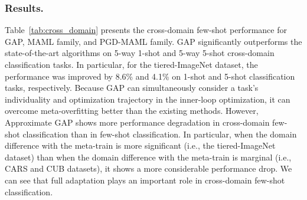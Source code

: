 \subsubsection{Results.}
Table~\ref{tab:cross_domain} presents the cross-domain few-shot performance for GAP, MAML family, and PGD-MAML family. GAP significantly outperforms the state-of-the-art algorithms on 5-way 1-shot and 5-way 5-shot cross-domain classification tasks. In particular, for the tiered-ImageNet dataset, the performance was improved by 8.6\% and 4.1\% on 1-shot and 5-shot classification tasks, respectively. Because GAP can simultaneously consider a task's individuality and optimization trajectory in the inner-loop optimization, it can overcome meta-overfitting better than the existing methods. 
However, Approximate GAP shows more performance degradation in cross-domain few-shot classification than in few-shot classification. 
In particular, when the domain difference with the meta-train is more significant (i.e., the tiered-ImageNet dataset) than when the domain difference with the meta-train is marginal (i.e., CARS and CUB datasets), it shows a more considerable performance drop. 
We can see that full adaptation plays an important role in cross-domain few-shot classification. 

